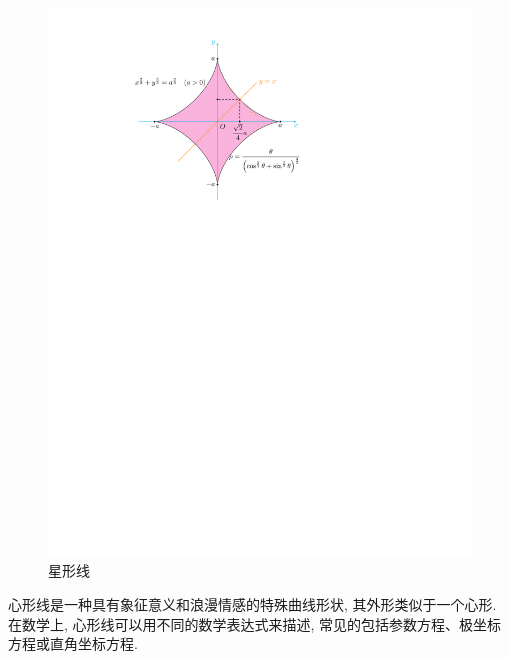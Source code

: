\begin{figure}[H]
    \centering
    \includegraphics{figures/StarLine.pdf}
    \caption{星形线}
    \label{starLine}
\end{figure}


心形线是一种具有象征意义和浪漫情感的特殊曲线形状, 其外形类似于一个心形. 在数学上, 心形线可以用不同的数学表达式来描述, 常见的包括参数方程、极坐标方程或直角坐标方程.

